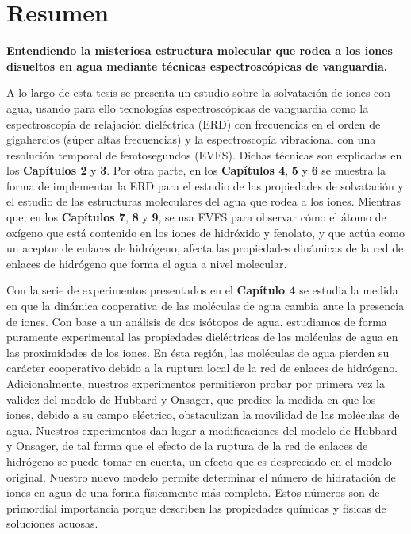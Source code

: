 
\chapter*{Resumen}


\begin{center}
	\textcolor{SchoolColor}{\Titulosize\bfseries Entendiendo la misteriosa estructura molecular que rodea a los iones disueltos en agua mediante t\'ecnicas espectrosc\'opicas de vanguardia.} \normalsize \\
	\vspace*{9pt}
\end{center}


A lo largo de esta tesis se presenta un estudio sobre la solvataci\'on de iones con agua, usando para ello tecnolog\'ias espectrosc\'opicas de vanguardia como la espectroscop\'ia de relajaci\'on diel\'ectrica (ERD) con frecuencias en el orden de gigahercios (s\'uper altas frecuencias) y la espectroscop\'ia vibracional con una resoluci\'on temporal de femtosegundos (EVFS). Dichas t\'ecnicas son explicadas en los \textbf{Cap\'itulos 2} y \textbf{3}. Por otra parte, en los \textbf{Cap\'itulos 4}, \textbf{5} y \textbf{6} se muestra la forma de implementar la ERD para el estudio de las propiedades de solvataci\'on y el estudio de las estructuras moleculares del agua que rodea a los iones. Mientras que, en los \textbf{Cap\'itulos 7}, \textbf{8} y \textbf{9}, se usa EVFS para observar c\'omo el \'atomo de ox\'igeno que est\'a contenido en los iones de hidr\'oxido y fenolato, y que act\'ua como un aceptor de enlaces de hidr\'ogeno,  afecta las propiedades din\'amicas de la red de enlaces de hidr\'ogeno que forma el agua a nivel molecular. 


Con la serie de experimentos presentados en el \textbf{Cap\'itulo 4} se estudia la medida en que la din\'amica cooperativa de las mol\'eculas de agua cambia ante la presencia de iones. Con base a un an\'alisis de dos is\'otopos de agua, estudiamos de forma puramente experimental las propiedades diel\'ectricas de las mol\'eculas de agua en las proximidades de los iones. En \'esta regi\'on, las mol\'eculas de agua pierden su car\'acter cooperativo debido a la ruptura local de la red de enlaces de hidr\'ogeno. Adicionalmente, nuestros experimentos permitieron probar por primera vez la validez del modelo de Hubbard y Onsager, que predice la medida en que los iones, debido a su campo el\'ectrico, obstaculizan la movilidad de las mol\'eculas de agua. Nuestros experimentos dan lugar a modificaciones del modelo de Hubbard y Onsager, de tal forma que el efecto de la ruptura de la red de enlaces de hidr\'ogeno se puede tomar en cuenta, un efecto que es despreciado en el modelo original. Nuestro nuevo modelo permite determinar el n\'umero de hidrataci\'on de iones en agua de una forma f\'isicamente m\'as completa. Estos n\'umeros son de primordial importancia porque describen las propiedades qu\'imicas y f\'isicas de soluciones acuosas.




